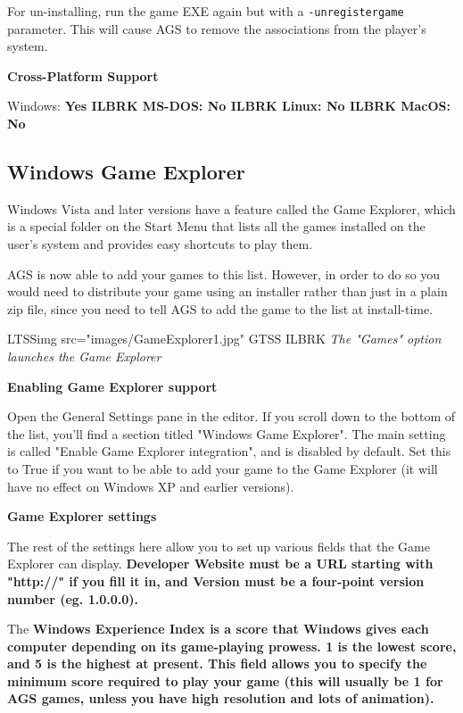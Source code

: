 For un-installing, run the game EXE again but with a  \verb$-unregistergame$  parameter.
This will cause AGS to remove the associations from the player's system.

\bf{Cross-Platform Support}

Windows: \bf{ Yes }ILBRK
MS-DOS: \bf{ No }ILBRK
Linux: \bf{ No }ILBRK
MacOS: \bf{ No }


\subsection{Windows Game Explorer}\label{GameExplorer}%

Windows Vista and later versions have a feature called the Game Explorer, which is a special folder on
the Start Menu that lists all the games installed on the user's system and provides
easy shortcuts to play them.

AGS is now able to add your games to this list. However, in order to do so you
would need to distribute your game using an installer rather than just in a plain
zip file, since you need to tell AGS to add the game to the list at install-time.

LTSSimg src="images/GameExplorer1.jpg" GTSS ILBRK
\it{The "Games" option launches the Game Explorer}

\bf{Enabling Game Explorer support}

Open the General Settings pane in the editor. If you scroll down to the bottom of the
list, you'll find a section titled "Windows Game Explorer". The main setting
is called "Enable Game Explorer integration", and is disabled by default. Set this
to True if you want to be able to add your game to the Game Explorer (it will
have no effect on Windows XP and earlier versions).

\bf{Game Explorer settings}

The rest of the settings here allow you to set up various fields that the Game Explorer
can display. \bf{Developer Website} must be a URL starting with "http://" if you fill
it in, and \bf{Version} must be a four-point version number (eg. 1.0.0.0).

The \bf{Windows Experience Index} is a score that Windows gives each computer depending
on its game-playing prowess. 1 is the lowest score, and 5 is the highest at present.
This field allows you to specify the minimum score required to play your game (this
will usually be 1 for AGS games, unless you have high resolution and lots of animation).

